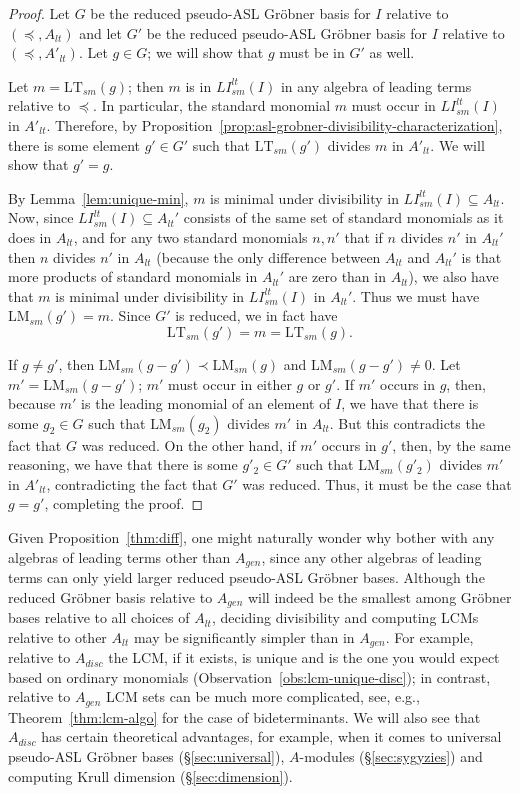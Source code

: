 \documentclass[11pt,reqno]{amsart}
\newcommand{\lmsm}{\text{LM}_{sm}}
\newcommand{\ltsm}{\text{LT}_{sm}}
\newcommand{\lismlt}{LI_{sm}^{lt}}
\theoremstyle{definition}
\numberwithin{equation}{section}
\begin{document}
\begin{proof}
Let $G$ be the reduced pseudo-ASL Gröbner basis for $I$ relative to $(\preceq, A_{lt})$ and let $G'$ be the reduced pseudo-ASL Gröbner basis for $I$ relative to $(\preceq, A'_{lt})$. Let $g \in G$; we will show that $g$ must be in $G'$ as well. 

Let $m = \ltsm(g)$; then $m$ is in $\lismlt(I)$ in any algebra of leading terms relative to $\preceq$.  In particular, the standard monomial $m$ must occur in $\lismlt(I)$ in $A'_{lt}$. Therefore, by Proposition~\ref{prop:asl-grobner-divisibility-characterization}, there is some element $g' \in G'$ such that $\ltsm(g')$ divides $m$ in $A'_{lt}$. We will show that $g' = g$. 

By Lemma~\ref{lem:unique-min}, $m$ is minimal under divisibility in $\lismlt(I) \subseteq A_{lt}$. Now, since $\lismlt(I) \subseteq A_{lt}'$ consists of the same set of standard monomials as it does in $A_{lt}$, and for any two standard monomials $n,n'$ that if $n$ divides $n'$ in $A_{lt}'$ then $n$ divides $n'$ in $A_{lt}$ (because the only difference between $A_{lt}$ and $A_{lt}'$ is that more products of standard monomials in $A_{lt}'$ are zero than in $A_{lt}$), we also have that $m$ is minimal under divisibility in $\lismlt(I)$ in $A_{lt}'$. Thus we must have $\lmsm(g') = m$. Since $G'$ is reduced, we in fact have 
\[
\ltsm(g') = m = \ltsm(g).
\] 

If $g \neq g'$, then $\lmsm(g-g') \prec \lmsm(g)$ and $\lmsm(g-g') \neq 0$. Let $m' = \lmsm(g-g')$; $m'$ must occur in either $g$ or $g'$. If $m'$ occurs in $g$, then, because $m'$ is the leading monomial of an element of $I$, we have that there is some $g_2 \in G$ such that $\lmsm(g_2)$ divides $m'$ in $A_{lt}$. But this contradicts the fact that $G$ was reduced. On the other hand, if $m'$ occurs in $g'$, then, by the same reasoning, we have that there is some $g'_2 \in G'$ such that $\lmsm(g'_2)$ divides $m'$ in $A'_{lt}$, contradicting the fact that $G'$ was reduced. Thus, it must be the case that $g=g'$, completing the proof.
\end{proof}

\begin{remark}
Given Proposition~\ref{thm:diff}, one might naturally wonder why bother with any algebras of leading terms other than $A_{gen}$, since any other algebras of leading terms can only yield larger reduced pseudo-ASL Gröbner bases. Although the reduced Gröbner basis relative to $A_{gen}$ will indeed be the smallest among Gröbner bases relative to all choices of $A_{lt}$, deciding divisibility and computing LCMs relative to other $A_{lt}$ may be significantly simpler than in $A_{gen}$. For example, relative to $A_{disc}$ the LCM, if it exists, is unique and is the one you would expect based on ordinary monomials (Observation~\ref{obs:lcm-unique-disc}); in contrast, relative to $A_{gen}$ LCM sets can be much more complicated, see, e.g., Theorem~\ref{thm:lcm-algo} for the case of bideterminants. We will also see that $A_{disc}$ has certain theoretical advantages, for example, when it comes to universal pseudo-ASL Gröbner bases (\S \ref{sec:universal}), $A$-modules (\S \ref{sec:sygyzies}) and computing Krull dimension (\S \ref{sec:dimension}).
\end{remark}
\end{document}

